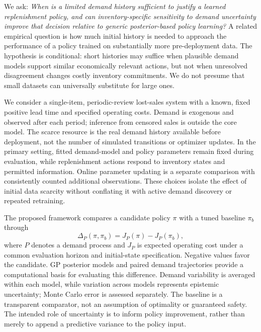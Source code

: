We ask: \emph{When is a limited demand history sufficient to justify a learned replenishment policy, and can inventory-specific sensitivity to demand uncertainty improve that decision relative to generic posterior-based policy learning?} A related empirical question is how much initial history is needed to approach the performance of a policy trained on substantially more pre-deployment data. The hypothesis is conditional: short histories may suffice when plausible demand models support similar economically relevant actions, but not when unresolved disagreement changes costly inventory commitments. We do not presume that small datasets can universally substitute for large ones.

We consider a single-item, periodic-review lost-sales system with a known, fixed positive lead time and specified operating costs. Demand is exogenous and observed after each period; inference from censored sales is outside the core model. The scarce resource is the real demand history available before deployment, not the number of simulated transitions or optimizer updates. In the primary setting, fitted demand-model and policy parameters remain fixed during evaluation, while replenishment actions respond to inventory states and permitted information. Online parameter updating is a separate comparison with consistently counted additional observations. These choices isolate the effect of initial data scarcity without conflating it with active demand discovery or repeated retraining.

The proposed framework compares a candidate policy $\pi$ with a tuned baseline $\pi_b$ through
\begin{equation}
\Delta_P(\pi,\pi_b)=J_P(\pi)-J_P(\pi_b),
\label{eq:intro-policy-difference}
\end{equation}
where $P$ denotes a demand process and $J_P$ is expected operating cost under a common evaluation horizon and initial-state specification. Negative values favor the candidate. GP posterior models and paired demand trajectories provide a computational basis for evaluating this difference. Demand variability is averaged within each model, while variation across models represents epistemic uncertainty; Monte Carlo error is assessed separately. The baseline is a transparent comparator, not an assumption of optimality or guaranteed safety. The intended role of uncertainty is to inform policy improvement, rather than merely to append a predictive variance to the policy input.

